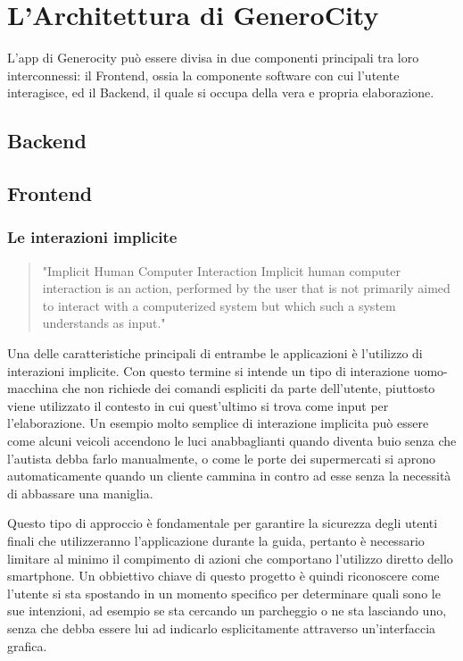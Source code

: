 \chapter{L'Architettura di GeneroCity}

L'app di Generocity può essere divisa in due componenti principali tra loro interconnessi:  il Frontend, ossia la componente software  con cui l'utente interagisce, ed il Backend, il quale si occupa della vera e propria elaborazione.
\section{Backend}
\section{Frontend}
\subsection{Le interazioni implicite}
\begin{quote}
"Implicit Human Computer Interaction
Implicit human computer interaction is an action,
performed by the user that is not primarily aimed
to interact with a computerized system but which
such a system understands as input."\cite{implicit-interaction}
\end{quote}
Una delle caratteristiche principali di entrambe le applicazioni è l'utilizzo di interazioni implicite. Con questo termine si intende un tipo di interazione uomo-macchina che non richiede dei comandi espliciti da parte dell'utente, piuttosto viene utilizzato il contesto in cui quest'ultimo si trova come input per l'elaborazione. Un esempio molto semplice di interazione implicita può essere come alcuni veicoli accendono le luci anabbaglianti quando diventa buio senza che l'autista debba farlo manualmente, o come le porte dei supermercati si aprono automaticamente quando un cliente cammina in contro ad esse senza la necessità di abbassare una maniglia. 

Questo tipo di approccio è fondamentale per garantire la sicurezza degli utenti finali che utilizzeranno l'applicazione durante la guida, pertanto è necessario limitare al minimo il compimento di azioni che comportano l'utilizzo diretto dello smartphone. Un obbiettivo chiave di questo progetto è quindi riconoscere come l'utente si sta spostando in un momento specifico per determinare quali sono le sue intenzioni, ad esempio se sta cercando un parcheggio o ne sta lasciando uno, senza che debba essere lui ad indicarlo esplicitamente attraverso un'interfaccia grafica.
